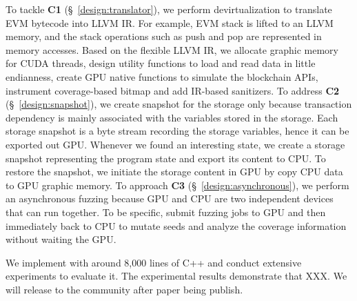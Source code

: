 

To tackle \textbf{C1} (\S~\ref{design:translator}), we perform devirtualization to translate EVM bytecode into LLVM IR. For example, EVM stack is lifted to an LLVM memory, and the stack operations such as push and pop are represented in memory accesses. Based on the flexible LLVM IR, we allocate graphic memory for CUDA threads, design utility functions to load and read data in little endianness, create GPU native functions to simulate the blockchain APIs, instrument coverage-based bitmap and add IR-based sanitizers. 
%
To address \textbf{C2} (\S~\ref{design:snapshot}), we create snapshot for the storage only because transaction dependency is mainly associated with the variables stored in the storage. 
Each storage snapshot is a byte stream recording the storage variables, hence it can be exported out GPU. 
Whenever we found an interesting state, we create a storage snapshot representing the program state and export its content to CPU. To restore the snapshot, we initiate the storage content in GPU by copy CPU data to GPU graphic memory.
%
To approach \textbf{C3} (\S~\ref{design:asynchronous}), we perform an asynchronous fuzzing because GPU and CPU are two independent devices that can run together. 
To be specific, {\tool} submit fuzzing jobs to GPU and then immediately back to CPU to mutate seeds and analyze the coverage information without waiting the GPU. 


We implement {\tool} with around 8,000 lines of C++ and conduct extensive experiments to evaluate it. 
The experimental results demonstrate that {\tool} XXX. 
We will release {\tool} to the community after paper being publish.



